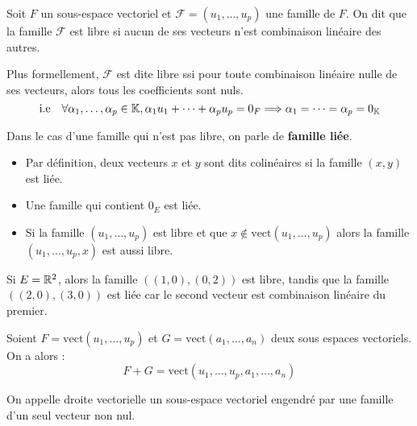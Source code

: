 \begin{definition}
    Soit $F$ un sous-espace vectoriel et $ \mathcal{F} = (u_1, \dots, u_p)$ une famille de $F$. 
    On dit que la famille $ \mathcal{F}$ est libre si aucun de ses vecteurs n'est combinaison linéaire des autres. 
    
    \vspace{0.3cm}
    
    Plus formellement, $ \mathcal{F}$ est dite libre ssi pour toute combinaison linéaire nulle de ses vecteurs, alors 
    tous les coefficients sont nuls. 
        \[ \text{i.e} \quad \forall \alpha_1, \dots, \alpha_p \in \mathbb{K}, \alpha_1 u_1 + \dots + \alpha_p u_p = 0_F \Longrightarrow \alpha_1 = \dots = \alpha_p = 0_{\mathbb{K}} \]
    
    Dans le cas d'une famille qui n'est pas libre, on parle de \textbf{famille liée}. 
\end{definition}

\begin{remark}
    \begin{itemize}
        \item Par définition, deux vecteurs $x$ et $y$ sont dits colinéaires si la famille $(x,y)$ est liée. 
        \item Une famille qui contient $0_E$ est liée. 
        \item Si la famille $(u_1, \dots, u_p)$ est libre et que $x \not \in \text{vect}(u_1, \dots, u_p)$ 
            alors la famille $(u_1, \dots, u_p, x)$ est aussi libre. 
    \end{itemize}
\end{remark}

\begin{example}
    Si $E = \mathbb{R}^2$, alors la famille $((1,0), (0,2))$ est libre, tandis que la famille $((2,0), (3,0))$ est liée
    car le second vecteur est combinaison linéaire du premier. 
\end{example}

\begin{proposition}
    Soient $F = \text{vect}(u_1, \dots, u_p)$ et $G = \text{vect}(a_1, \dots, a_n)$ deux sous espaces vectoriels.
    On a alors : 
        \[ F + G = \text{vect}(u_1, \dots, u_p, a_1, \dots, a_n) \] 
\end{proposition}

\begin{definition}
    On appelle droite vectorielle un sous-espace vectoriel engendré par une famille d'un seul vecteur non nul. 
\end{definition}

